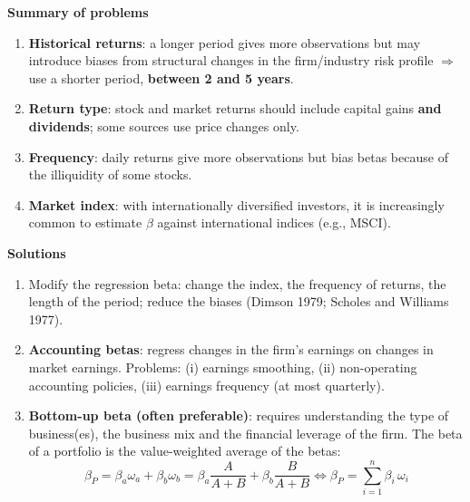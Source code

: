 \textbf{Summary of problems}
\begin{enumerate}
  \item \textbf{Historical returns}: a longer period gives more observations but may introduce biases from structural changes in the firm/industry risk profile $\Rightarrow$ use a shorter period, \textbf{between 2 and 5 years}.
  \item \textbf{Return type}: stock and market returns should include capital gains \textbf{and dividends}; some sources use price changes only.
  \item \textbf{Frequency}: daily returns give more observations but bias betas because of the illiquidity of some stocks.
  \item \textbf{Market index}: with internationally diversified investors, it is increasingly common to estimate $\beta$ against international indices (e.g., MSCI).
\end{enumerate}
\textbf{Solutions}
\begin{enumerate}
  \item Modify the regression beta: change the index, the frequency of returns, the length of the period; reduce the biases (Dimson 1979; Scholes and Williams 1977).
  \item \textbf{Accounting betas}: regress changes in the firm's earnings on changes in market earnings. Problems: (i) earnings smoothing, (ii) non-operating accounting policies, (iii) earnings frequency (at most quarterly).
  \item \textbf{Bottom-up beta (often preferable)}: requires understanding the type of business(es), the business mix and the financial leverage of the firm. The beta of a portfolio is the value-weighted average of the betas:
  \[
  \beta_P=\beta_a\omega_a+\beta_b\omega_b=\beta_a\frac{A}{A+B}+\beta_b\frac{B}{A+B}\iff \beta_P=\sum_{i=1}^{n}\beta_i\,\omega_i
  \]
\end{enumerate}


